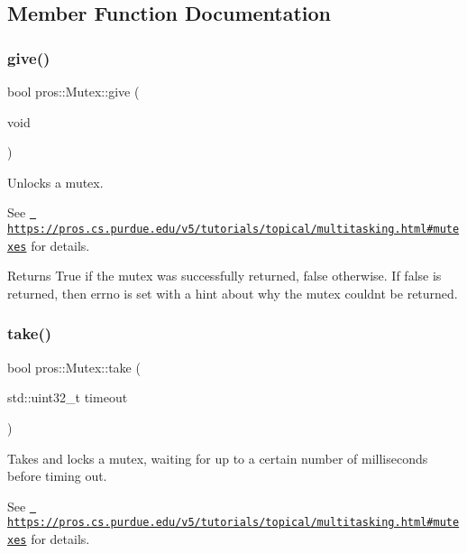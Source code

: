 \subsection{Member Function Documentation}
\mbox{\label{classpros_1_1Mutex_a1c3e7ee193608a27a5a509ee7930363b}} 
\subsubsection{\texorpdfstring{give()}{give()}}
{\footnotesize\ttfamily bool pros\+::\+Mutex\+::give (\begin{DoxyParamCaption}\item[{void}]{ }\end{DoxyParamCaption})}



Unlocks a mutex. 

See \href{https://pros.cs.purdue.edu/v5/tutorials/topical/multitasking.html\#mutexes}{\texttt{ https\+://pros.\+cs.\+purdue.\+edu/v5/tutorials/topical/multitasking.\+html\#mutexes}} for details.

\begin{DoxyReturn}{Returns}
True if the mutex was successfully returned, false otherwise. If false is returned, then errno is set with a hint about why the mutex couldn\textquotesingle{}t be returned. 
\end{DoxyReturn}
\mbox{\label{classpros_1_1Mutex_a70da733375f7b4b68475881578c78516}} 
\subsubsection{\texorpdfstring{take()}{take()}}
{\footnotesize\ttfamily bool pros\+::\+Mutex\+::take (\begin{DoxyParamCaption}\item[{std\+::uint32\+\_\+t}]{timeout }\end{DoxyParamCaption})}



Takes and locks a mutex, waiting for up to a certain number of milliseconds before timing out. 

See \href{https://pros.cs.purdue.edu/v5/tutorials/topical/multitasking.html\#mutexes}{\texttt{ https\+://pros.\+cs.\+purdue.\+edu/v5/tutorials/topical/multitasking.\+html\#mutexes}} for details.


